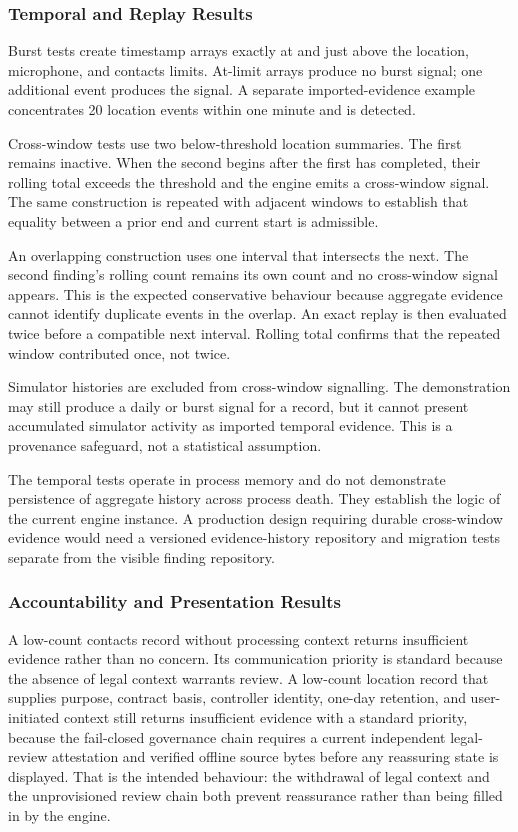 \subsubsection{Temporal and Replay Results}

Burst tests create timestamp arrays exactly at and just above the location, microphone, and contacts limits. At-limit arrays produce no burst signal; one additional event produces the signal. A separate imported-evidence example concentrates 20 location events within one minute and is detected.

Cross-window tests use two below-threshold location summaries. The first remains inactive. When the second begins after the first has completed, their rolling total exceeds the threshold and the engine emits a cross-window signal. The same construction is repeated with adjacent windows to establish that equality between a prior end and current start is admissible.

An overlapping construction uses one interval that intersects the next. The second finding's rolling count remains its own count and no cross-window signal appears. This is the expected conservative behaviour because aggregate evidence cannot identify duplicate events in the overlap. An exact replay is then evaluated twice before a compatible next interval. Rolling total confirms that the repeated window contributed once, not twice.

Simulator histories are excluded from cross-window signalling. The demonstration may still produce a daily or burst signal for a record, but it cannot present accumulated simulator activity as imported temporal evidence. This is a provenance safeguard, not a statistical assumption.

The temporal tests operate in process memory and do not demonstrate persistence of aggregate history across process death. They establish the logic of the current engine instance. A production design requiring durable cross-window evidence would need a versioned evidence-history repository and migration tests separate from the visible finding repository.

\subsubsection{Accountability and Presentation Results}

A low-count contacts record without processing context returns insufficient evidence rather than no concern. Its communication priority is standard because the absence of legal context warrants review. A low-count location record that supplies purpose, contract basis, controller identity, one-day retention, and user-initiated context still returns insufficient evidence with a standard priority, because the fail-closed governance chain requires a current independent legal-review attestation and verified offline source bytes before any reassuring state is displayed. That is the intended behaviour: the withdrawal of legal context and the unprovisioned review chain both prevent reassurance rather than being filled in by the engine.

